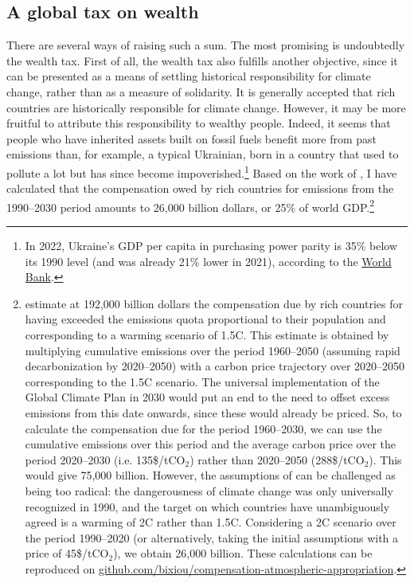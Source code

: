 \documentclass[a5paper,english,openany]{memoir}
\begin{document}
\subsection{A global tax on wealth} %
There are several ways of raising such a sum. The most promising is undoubtedly the wealth tax. First of all, the wealth tax also fulfills another objective, since it can be presented as a means of settling 
historical responsibility for climate change, rather than as a measure of solidarity. It is generally accepted that rich countries are historically responsible for climate change. However, it may be more fruitful to attribute this responsibility to wealthy people. Indeed, it seems that people who have inherited assets built on fossil fuels benefit more from past emissions than, for example, a typical Ukrainian, born in a country that used to pollute a lot but has since become impoverished.\footnote{In 2022, Ukraine's GDP per capita in purchasing power parity is 35\% below its 1990 level (and was already 21\% lower in 2021), according to the \href{https://data.worldbank.org/indicator/NY.GDP.PCAP.PP.KD?locations=UA}{World Bank}.} %
Based on the work of \cite{fanning_compensation_2023}, I have calculated that the compensation owed by rich countries for emissions from the 1990--2030 period amounts to 26,000 billion dollars, or 25\% of world GDP.\footnote{\cite{fanning_compensation_2023} estimate at 192,000 billion dollars the compensation due by rich countries for having exceeded the emissions quota proportional to their population and corresponding to a warming scenario of 1.5\textdegree{}C. This estimate is obtained by multiplying cumulative emissions over the period 1960--2050 (assuming rapid decarbonization by 2020--2050) %
with a carbon price trajectory over 2020--2050 corresponding to the 1.5\textdegree{}C scenario. The universal implementation of the Global Climate Plan in 2030 would put an end to the need to offset excess emissions from this date onwards, since these would already be priced. So, to calculate the compensation due for the period 1960--2030, we can use the cumulative emissions over this period and the average carbon price over the period 2020--2030 (i.e. 135\$/tCO$_\text{2}$) rather than 2020--2050 (288\$/tCO$_\text{2}$). This would give 75,000 billion. However, the assumptions of \cite{fanning_compensation_2023} can be challenged as being too radical: the dangerousness of climate change was only universally recognized in 1990, and the target on which countries have unambiguously agreed is a warming of 2\textdegree{}C rather than 1.5\textdegree{}C. Considering a 2\textdegree{}C scenario over the period 1990--2020 (or alternatively, taking the initial assumptions with a price of 45\$/tCO$_\text{2}$), we obtain 26,000 billion. These calculations can be reproduced on \href{https://github.com/bixiou/compensation-atmospheric-appropriation}{github.com/bixiou/compensation-atmospheric-appropriation}.} 
\end{document}
